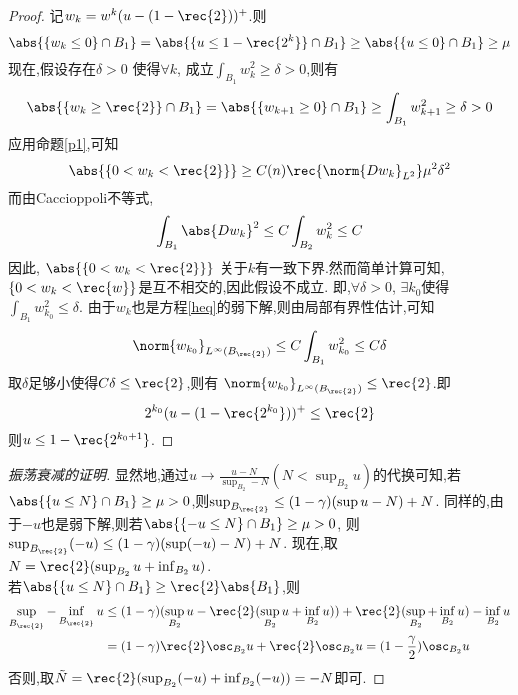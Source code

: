 \begin{proof}
    记$w_k=w^k(u-(1-\rec{2}))^+$.则
    \begin{equation}
        \abs{\{w_k \le 0\} \cap B_1} =\abs{\{u \le 1-\rec{2^k}\}\cap B_1} \ge \abs{\{u \le 0\}\cap B_1} \ge \mu
    \end{equation}
    现在,假设存在$\delta >0$ 使得$\forall k$, 成立$\int_{B_1}w_k^2 \ge \delta >0$,则有
    \begin{equation}
        \abs{\{w_k \ge \rec{2}\}\cap B_1} = \abs{\{w_{k+1}\ge 0\} \cap B_1} \ge \int_{B_1}w^2_{k+1} \ge \delta >0
    \end{equation}
    应用命题\eqref{p1},可知
    \begin{equation}
        \abs{\{0<w_k <\rec{2}\}} \ge C(n)\rec{\norm{Dw_k}_{L^2}}\mu^2\delta^2
    \end{equation}
    而由Caccioppoli不等式,
    \begin{equation}
        \int_{B_1}\abs{Dw_k}^2 \le C\int_{B_2}w_k^2 \le C
    \end{equation}
    因此, $\abs{\{0<w_k<\rec{2}\}}$ 关于$k$有一致下界.然而简单计算可知,$\{0<w_k < \rec{w}\}$是互不相交的,因此假设不成立. 即,$\forall \delta >0$, $\exists k_0$使得$\int_{B_1}w_{k_0}^2 \le \delta$. 由于$w_k$也是方程\eqref{heq}的弱下解,则由局部有界性估计,可知
    \begin{equation}
        \norm{w_{k_0}}_{L^\infty(B_\rec{2})} \le C\int_{B_1}w_{k_0}^2 \le C\delta
    \end{equation}
    取$\delta$足够小使得$C\delta \le \rec{2}$,则有 $\norm{w_{k_0}}_{L^\infty(B_\rec{2})} \le \rec{2}$.即
    \begin{equation}
        2^{k_0}(u-(1-\rec{2^{k_0}}))^+ \le \rec{2}
    \end{equation}
    则$u \le 1-\rec{2^{k_0+1}}$.
\end{proof}
\begin{proof}[振荡衰减的证明]
    显然地,通过$u \to \frac{u-N}{\sup_{B_2}-N} (N < \sup_{B_2}u)$的代换可知,若$\abs{\{u \le N\}\cap B_1} \ge \mu >0$,则$\sup_{B_\rec{2}} \le (1-\gamma)(\sup u-N)+N$. 
    同样的,由于$-u$也是弱下解,则若$\abs{\{-u \le N\}\cap B_1} \ge \mu >0$, 则$\sup_{B_\rec{2}}(-u) \le (1-\gamma)(\sup(-u)-N)+N$.  现在,取$N=\rec{2}(\sup_{B_2}u+\inf_{B_2}u)$. \\
    若$\abs{\{u \le N\}\cap B_1} \ge \rec{2}\abs{B_1}$,则
    \begin{equation}
        \begin{split}
            \sup_{B_\rec{2}}-\inf_{B_\rec{2}}u &\le (1-\gamma)(\sup_{B_2}u-\rec{2}(\sup_{B_2}u+\inf_{B_2}u))+\rec{2}(\sup_{B_2}+\inf_{B_2}u)-\inf_{B_2}u\\
            &=(1-\gamma)\rec{2}\osc_{B_2}u+\rec{2}\osc_{B_2}u =(1-\frac{\gamma}{2})\osc_{B_2}u
        \end{split}
    \end{equation}
    否则,取$\tilde{{N}}=\rec{2}(\sup_{B_2}(-u)+\inf_{B_2}(-u))=-N$即可.
\end{proof}
